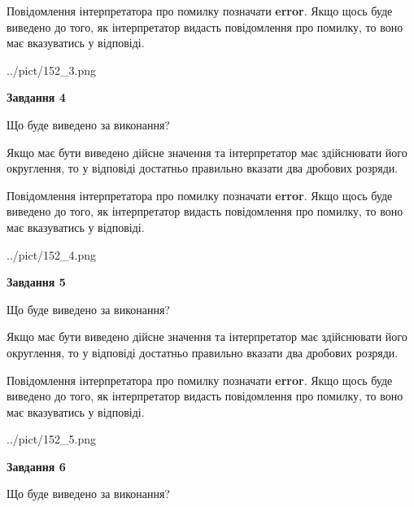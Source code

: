 \documentclass[12pt, ukrainian]{article}
\begin{document}
{\begin {Large}
Повідомлення інтерпретатора про помилку позначати \textbf{error}.
Якщо щось буде виведено до того, як інтерпретатор видасть повідомлення про помилку, 
то воно має вказуватись у відповіді. \par

\begin{center}
	{../pict/152_3.png}
\end{center}
\newpage

{\begin {center}\textbf{Завдання 4}\end {center}}\par
Що буде виведено за виконання? \par

Якщо має бути виведено дійсне значення та інтерпретатор має здійснювати його округлення, 
то у відповіді достатньо правильно вказати два дробових розряди.

Повідомлення інтерпретатора про помилку позначати \textbf{error}.
Якщо щось буде виведено до того, як інтерпретатор видасть повідомлення про помилку, 
то воно має вказуватись у відповіді. \par

\begin{center}
	{../pict/152_4.png}
\end{center}
\newpage

{\begin {center}\textbf{Завдання 5}\end {center}}\par
Що буде виведено за виконання? \par

Якщо має бути виведено дійсне значення та інтерпретатор має здійснювати його округлення, 
то у відповіді достатньо правильно вказати два дробових розряди.

Повідомлення інтерпретатора про помилку позначати \textbf{error}.
Якщо щось буде виведено до того, як інтерпретатор видасть повідомлення про помилку, 
то воно має вказуватись у відповіді. \par

\begin{center}
	{../pict/152_5.png}
\end{center}
\newpage

{\begin {center}\textbf{Завдання 6}\end {center}}\par
Що буде виведено за виконання? \par


\end{Large}}
\end{document}
